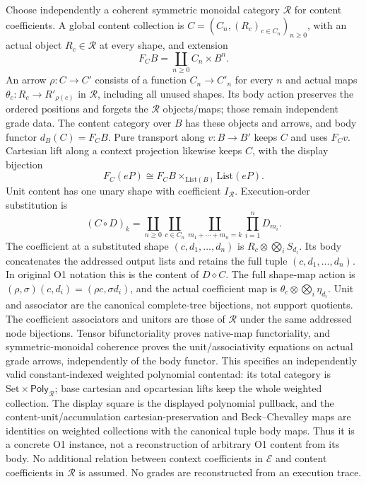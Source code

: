 \documentclass[11pt]{article}
\begin{document}
Choose independently a coherent symmetric monoidal category $\mathcal R$ for content coefficients. A global content collection is $C=(C_n,(R_c)_{c\in C_n})_{n\geq0}$, with an actual object $R_c\in\mathcal R$ at every shape, and extension
\[
 F_CB=\coprod_{n\geq0}C_n\times B^n.
\]
An arrow $\rho:C\to C'$ consists of a function $C_n\to C'_n$ for every $n$ and actual maps $\theta_c:R_c\to R'_{\rho(c)}$ in $\mathcal R$, including all unused shapes. Its body action preserves the ordered positions and forgets the $\mathcal R$ objects/maps; those remain independent grade data. The content category over $B$ has these objects and arrows, and body functor $d_B(C)=F_CB$. Pure transport along $v:B\to B'$ keeps $C$ and uses $F_Cv$. Cartesian lift along a context projection likewise keeps $C$, with the display bijection
\[
 F_C(eP)\cong F_CB\times_{\mathrm{List}(B)}\mathrm{List}(eP).
\]
Unit content has one unary shape with coefficient $I_{\mathcal R}$. Execution-order substitution is
\[
 (C\circ D)_k=\coprod_{n\geq0}\coprod_{c\in C_n}
 \coprod_{m_1+\cdots+m_n=k}\prod_{i=1}^nD_{m_i}.
\]
The coefficient at a substituted shape $(c,d_1,\ldots,d_n)$ is $R_c\otimes\bigotimes_i S_{d_i}$. Its body concatenates the addressed output lists and retains the full tuple $(c,d_1,\ldots,d_n)$. In original O1 notation this is the content of $D\diamond C$. The full shape-map action is $(\rho,\sigma)(c,d_i)=(\rho c,\sigma d_i)$, and the actual coefficient map is $\theta_c\otimes\bigotimes_i\eta_{d_i}$. Unit and associator are the canonical complete-tree bijections, not support quotients. The coefficient associators and unitors are those of $\mathcal R$ under the same addressed node bijections. Tensor bifunctoriality proves native-map functoriality, and symmetric-monoidal coherence proves the unit/associativity equations on actual grade arrows, independently of the body functor. This specifies an independently valid constant-indexed weighted polynomial contentad: its total category is $\mathrm{Set}\times\mathsf{Poly}_{\mathcal R}$; base cartesian and opcartesian lifts keep the whole weighted collection. The display square is the displayed polynomial pullback, and the content-unit/accumulation cartesian-preservation and Beck--Chevalley maps are identities on weighted collections with the canonical tuple body maps. Thus it is a concrete O1 instance, not a reconstruction of arbitrary O1 content from its body. No additional relation between context coefficients in $\mathcal E$ and content coefficients in $\mathcal R$ is assumed. No grades are reconstructed from an execution trace.
\end{document}
